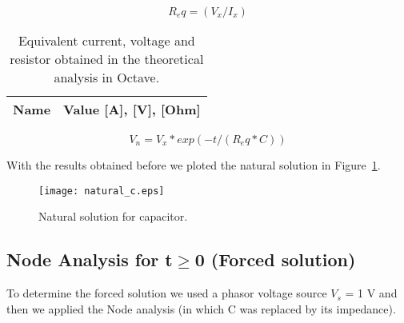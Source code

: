 \begin{equation}
R_eq = (V_x / I_x)
\end{equation}

\begin{table}[H]
  \centering
  \begin{tabular}{|l|r|}
    \hline    
    {\bf Name} & {\bf Value [A], [V], [Ohm]} \\ \hline
	
  \end{tabular}
  \caption{Equivalent current, voltage and resistor obtained in the theoretical analysis in Octave.}
  \label{tab:octave_tab2}
\end{table}
\begin{equation}
V_n = V_x * exp( -t / (R_eq * C))
\end{equation}

With the results obtained before we ploted the natural solution in Figure~\ref{fig:natural}.

\begin{figure}[H] \centering
	\texttt{[image: natural\_c.eps]}
	\caption{Natural solution for capacitor.}
	\label{fig:natural}
\end{figure}

\newpage
\subsection{Node Analysis for t$\geq$0 (Forced solution)}

\tab To determine the forced solution we used a phasor voltage source $V_s$ = 1 V and then we applied the Node analysis (in which C was replaced by its impedance).

